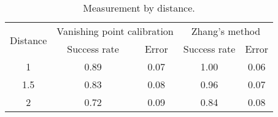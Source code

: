 \begin{table}[H]
\centering
\begin{tabular}{@{} *5c @{}}
\toprule
\multirow{2}{*}{Distance} & \multicolumn{2}{c}{Vanishing point calibration} & \multicolumn{2}{c}{Zhang's method}\\ 
\cmidrule(r){2-3}
\cmidrule(r){4-5}
& Success rate & Error & Success rate & Error \\
\midrule
 1 		& 0.89 & 0.07 & 1.00 & 0.06 \\ 
 1.5  	& 0.83 & 0.08 & 0.96 & 0.07 \\
 2 		& 0.72 & 0.09 & 0.84 & 0.08 \\
\bottomrule
 \end{tabular}
 \caption{Measurement by distance.}
\label{table:key_measurement_by_distance}
\end{table}
